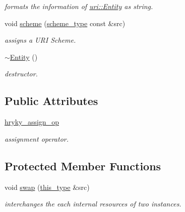 \begin{DoxyCompactItemize}
\begin{DoxyCompactList}\small\item\em formats the information of \hyperlink{classhryky_1_1uri_1_1_entity}{uri\-::\-Entity} as string. \end{DoxyCompactList}\item 
\hypertarget{classhryky_1_1uri_1_1_entity_a8408b94b4ab41c8bca14f0d2d2342d13}{void \hyperlink{classhryky_1_1uri_1_1_entity_a8408b94b4ab41c8bca14f0d2d2342d13}{scheme} (\hyperlink{classhryky_1_1uri_1_1scheme_1_1_entity}{scheme\-\_\-type} const \&src)}\label{classhryky_1_1uri_1_1_entity_a8408b94b4ab41c8bca14f0d2d2342d13}

\begin{DoxyCompactList}\small\item\em assigns a U\-R\-I Scheme. \end{DoxyCompactList}\item 
\hypertarget{classhryky_1_1uri_1_1_entity_a840a309192e0941bfb5ef382b6c73bca}{\hyperlink{classhryky_1_1uri_1_1_entity_a840a309192e0941bfb5ef382b6c73bca}{$\sim$\-Entity} ()}\label{classhryky_1_1uri_1_1_entity_a840a309192e0941bfb5ef382b6c73bca}

\begin{DoxyCompactList}\small\item\em destructor. \end{DoxyCompactList}\end{DoxyCompactItemize}
\subsection*{Public Attributes}
\begin{DoxyCompactItemize}
\item 
\hypertarget{classhryky_1_1uri_1_1_entity_ac4e744b8c3280e6a6995b40af65e1a1b}{\hyperlink{classhryky_1_1uri_1_1_entity_ac4e744b8c3280e6a6995b40af65e1a1b}{hryky\-\_\-assign\-\_\-op}}\label{classhryky_1_1uri_1_1_entity_ac4e744b8c3280e6a6995b40af65e1a1b}

\begin{DoxyCompactList}\small\item\em assignment operator. \end{DoxyCompactList}\end{DoxyCompactItemize}
\subsection*{Protected Member Functions}
\begin{DoxyCompactItemize}
\item 
\hypertarget{classhryky_1_1uri_1_1_entity_a2257d6deca01c7b246e6353c469be048}{void \hyperlink{classhryky_1_1uri_1_1_entity_a2257d6deca01c7b246e6353c469be048}{swap} (\hyperlink{classhryky_1_1uri_1_1_entity_ab22b480936b068a0cbe702a2d4345f90}{this\-\_\-type} \&src)}\label{classhryky_1_1uri_1_1_entity_a2257d6deca01c7b246e6353c469be048}

\begin{DoxyCompactList}\small\item\em interchanges the each internal resources of two instances. \end{DoxyCompactList}\end{DoxyCompactItemize}


